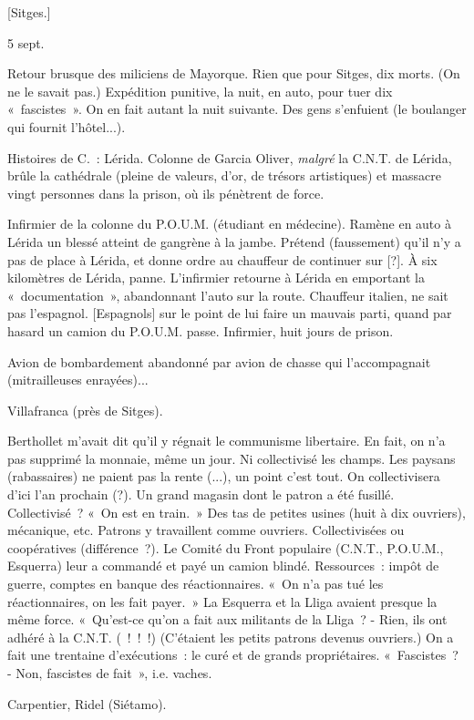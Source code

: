 \documentclass[french,twoside]{book} %
\begin{document}
[Sitges.]\par
5 sept.\par
Retour brusque des miliciens de Mayorque. Rien que pour Sitges, dix morts. (On ne le savait pas.) Expédition punitive, la nuit, en auto, pour tuer dix « fascistes ». On en fait autant la nuit suivante. Des gens s'enfuient (le boulanger qui fournit l'hôtel...).\par
Histoires de C. : Lérida. Colonne de Garcia Oliver, {\itshape malgré} la C.N.T. de Lérida, brûle la cathédrale (pleine de valeurs, d'or, de trésors artistiques) et massacre vingt personnes dans la prison, où ils pénètrent de force.\par
Infirmier de la colonne du P.O.U.M. (étudiant en médecine). Ramène en auto à Lérida un blessé atteint de gangrène à la jambe. Prétend (faussement) qu'il n'y a pas de place à Lérida, et donne ordre au chauffeur de continuer sur [?]. À six kilomètres de Lérida, panne. L'infirmier retourne à Lérida en emportant la « documentation », abandonnant l'auto sur la route. Chauffeur italien, ne sait pas l'espagnol. [Espagnols] sur le point de lui faire un mauvais parti, quand par hasard un camion du P.O.U.M. passe. Infirmier, huit jours de prison.\par
Avion de bombardement abandonné par avion de chasse qui l'accom­pagnait (mitrailleuses enrayées)...\par
Villafranca (près de Sitges).\par
Berthollet m'avait dit qu'il y régnait le communisme libertaire. En fait, on n'a pas supprimé la monnaie, même un jour. Ni collectivisé les champs. Les paysans (rabassaires) ne paient pas la rente (...), un point c'est tout. On collectivisera d'ici l'an prochain (?). Un grand magasin dont le patron a été fusillé. Collectivisé ? « On est en train. » Des tas de petites usines (huit à dix ouvriers), mécanique, etc. Patrons y travaillent comme ouvriers. Collectivisées ou coopératives (différence ?). Le Comité du Front populaire (C.N.T., P.O.U.M., Esquerra) leur a commandé et payé un camion blindé. Ressources : impôt de guerre, comptes en banque des réactionnaires. « On n'a pas tué les réactionnaires, on les fait payer. » La Esquerra et la Lliga avaient presque la même force. « Qu'est-ce qu'on a fait aux militants de la Lliga ? - Rien, ils ont adhéré à la C.N.T. ( ! ! !) (C'étaient les petits patrons devenus ouvriers.) On a fait une trentaine d'exécutions : le curé et de grands propriétaires. « Fascistes ? - Non, fascistes de fait », i.e. vaches.\par
Carpentier, Ridel (Siétamo).\par
\end{document}
